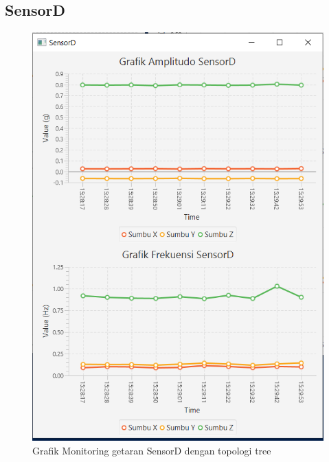 \subsection{SensorD}
\begin{figure}[H] 
	\centering  
	\includegraphics[scale=1]{Lampiran/HasilPengujian/sensorD_treeRooftop.PNG} 
	\caption[Grafik Monitoring getaran SensorD dengan topologi tree]{Grafik Monitoring getaran SensorD dengan topologi tree}
	\label{fig:grafik_D_tree_rooftop} 
\end{figure}

